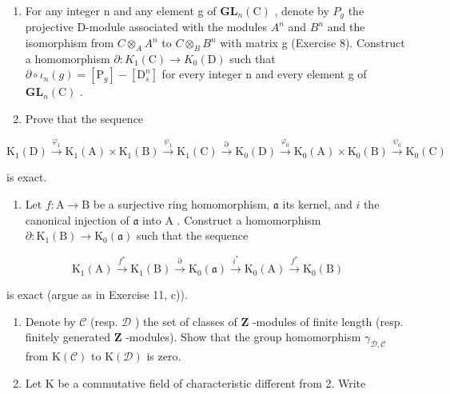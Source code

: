 \begin{enumerate}
\def\labelenumi{\alph{enumi})}
\setcounter{enumi}{1}
\item
  For any integer n and any element g of \(\mathbf{GL}_{n}(\mathrm{C})\) , denote by \(P_{g}\) the projective D-module associated with the modules \(A^{n}\) and \(B^{n}\) and the isomorphism from \(C \otimes_{A} A^{n}\) to \(C \otimes_{B} B^{n}\) with matrix g (Exercise 8). Construct a homomorphism \(\partial : K_{1}(\mathrm{C}) \to K_{0}(\mathrm{D})\) such that \(\partial \circ \iota_{n}(g) = [\mathrm{P}_{g}] - [\mathrm{D}_{s}^{n}]\) for every integer n and every element g of \(\mathbf{GL}_{n}(\mathrm{C})\) .
\item
  Prove that the sequence
\end{enumerate}

\[
\mathrm{K} _ {1} (\mathrm{D}) \xrightarrow {\varphi_ {1}} \mathrm{K} _ {1} (\mathrm{A}) \times \mathrm{K} _ {1} (\mathrm{B}) \xrightarrow {\psi_ {1}} \mathrm{K} _ {1} (\mathrm{C}) \xrightarrow {\partial} \mathrm{K} _ {0} (\mathrm{D}) \xrightarrow {\varphi_ {0}} \mathrm{K} _ {0} (\mathrm{A}) \times \mathrm{K} _ {0} (\mathrm{B}) \xrightarrow {\psi_ {0}} \mathrm{K} _ {0} (\mathrm{C})
\]

is exact.

\begin{enumerate}
\def\labelenumi{\arabic{enumi})}
\setcounter{enumi}{11}
\tightlist
\item
  Let \(f: \mathrm{A} \to \mathrm{B}\) be a surjective ring homomorphism, \(\mathfrak{a}\) its kernel, and \(i\) the canonical injection of \(\mathfrak{a}\) into \(\mathrm{A}\) . Construct a homomorphism \(\partial: \mathrm{K}_1(\mathrm{B}) \to \mathrm{K}_0(\mathfrak{a})\) such that the sequence
\end{enumerate}

\[
\mathrm{K} _ {1} (\mathrm{A}) \xrightarrow {f ^ {*}} \mathrm{K} _ {1} (\mathrm{B}) \xrightarrow {\partial} \mathrm{K} _ {0} (\mathfrak {a}) \xrightarrow {i ^ {*}} \mathrm{K} _ {0} (\mathrm{A}) \xrightarrow {f ^ {*}} \mathrm{K} _ {0} (\mathrm{B})
\]

is exact (argue as in Exercise 11, c)).

\begin{enumerate}
\def\labelenumi{\arabic{enumi})}
\setcounter{enumi}{12}
\item
  Denote by \(\mathcal{C}\) (resp. \(\mathcal{D}\) ) the set of classes of \(\mathbf{Z}\) -modules of finite length (resp. finitely generated \(\mathbf{Z}\) -modules). Show that the group homomorphism \(\gamma_{\mathcal{D},\mathcal{C}}\) from \(\mathrm{K}(\mathcal{C})\) to \(\mathrm{K}(\mathcal{D})\) is zero.
\item
  Let K be a commutative field of characteristic different from 2. Write
\end{enumerate}


